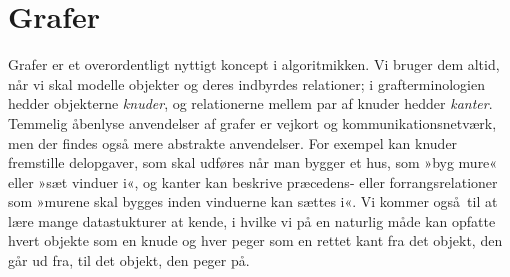 \section{Grafer}

Grafer er et overordentligt nyttigt koncept i algoritmikken.
Vi bruger dem altid, når vi skal modelle objekter og deres indbyrdes relationer; i grafterminologien hedder objekterne \emph{knuder}, og relationerne mellem par af knuder hedder \emph{kanter}.
Temmelig åbenlyse anvendelser af grafer er vejkort og kommunikationsnetværk, men der findes også mere abstrakte anvendelser.
For exempel kan knuder fremstille delopgaver, som skal udføres når man bygger et hus, som »byg mure« eller »sæt vinduer i«, og kanter kan beskrive præcedens- eller forrangsrelationer som »murene skal bygges inden vinduerne kan sættes i«.
Vi kommer også til at lære mange datastukturer at kende, i hvilke vi på en naturlig måde kan opfatte hvert objekte som en knude og hver peger som en rettet kant fra det objekt, den går ud fra, til det objekt, den peger på.

